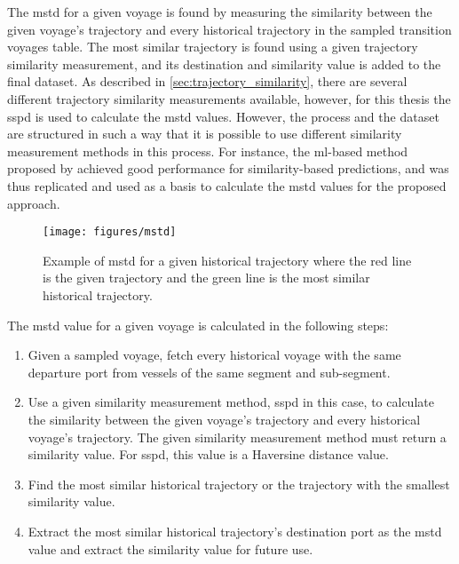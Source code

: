 The \acrshort{mstd} for a given voyage is found by measuring the similarity between the given voyage's trajectory and every historical trajectory in the sampled transition voyages table. The most similar trajectory is found using a given trajectory similarity measurement, and its destination and similarity value is added to the final dataset. As described in \cref{sec:trajectory_similarity}, there are several different trajectory similarity measurements available, however, for this thesis the \acrfull{sspd} is used to calculate the \acrshort{mstd} values. However, the process and the dataset are structured in such a way that it is possible to use different similarity measurement methods in this process. For instance, the \acrshort{ml}-based method proposed by  \cite{Zhang2020AISApproach} achieved good performance for similarity-based predictions, and was thus replicated and used as a basis to calculate the \acrshort{mstd} values for the proposed approach.

\begin{figure}[htbp]  %
    \centering
    \texttt{[image: figures/mstd]}
    \caption{Example of \acrshort{mstd} for a given historical trajectory where the red line is the given trajectory and the green line is the most similar historical trajectory.}
    \label{fig:mstd}
\end{figure}

The \acrshort{mstd} value for a given voyage is calculated in the following steps:

\begin{enumerate}
    \item Given a sampled voyage, fetch every historical voyage with the same departure port from vessels of the same segment and sub-segment.
    \item Use a given similarity measurement method, \acrshort{sspd} in this case, to calculate the similarity between the given voyage's trajectory and every historical voyage's trajectory. The given similarity measurement method must return a similarity value. For \acrshort{sspd}, this value is a Haversine distance value.
    \item Find the most similar historical trajectory or the trajectory with the smallest similarity value.
    \item Extract the most similar historical trajectory's destination port as the \acrshort{mstd} value and extract the similarity value for future use.
\end{enumerate}

